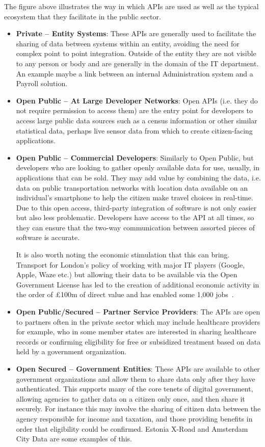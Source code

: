 The figure above illustrates the way in which APIs are used as well as the typical
ecosystem that they facilitate in the public sector.
\begin{itemize}
	\item \textbf{Private – Entity Systems}: These APIs are generally used to facilitate
	 the sharing of data between systems within an entity, avoiding the need
	 for complex point to point integration. Outside of the entity they are not visible
	 to any person or body and are generally in the domain of the IT
	 department. An example maybe a link between an internal Administration system and a Payroll solution.
	 \item \textbf{Open Public – At Large Developer Networks}: Open APIs (i.e. they do
	 not require permission to access them) are the entry point for developers
	 to access large public data sources such as a census information or other
	 similar statistical data, perhaps live sensor data from which to create
	 citizen-facing applications.
	 \item \textbf{Open Public – Commercial Developers}: Similarly to Open Public,
	 but developers who are
	 looking to gather openly available data for use, usually, in applications
	 that can be sold. They may add value by combining the data, i.e.
	 data on public transportation networks with location data available on an
	 individual’s smartphone to help the citizen make travel choices in real-time.
	 Due to this open access, third-party integration of software is not only easier
	 but also less problematic. Developers have access to the API at all times, so they can ensure that the two-way communication between assorted pieces of software is accurate.
	 
	 It is also worth noting the economic stimulation that this can bring. Transport
	 for London’s policy of working with major IT players (Google, Apple, Waze etc.)
	 but allowing their data to be available via the Open Government License has led
	 to the creation of additional economic activity in the order of £100m of direct
	 value and has enabled some 1,000 jobs~\citep{api_industrial_data}.
	 \item \textbf{Open Public/Secured – Partner Service Providers}: The APIs are open to
	 partners often in the private sector which may include healthcare providers
	 for example, who in some member states are interested in sharing healthcare
	 records or confirming eligibility for free or subsidized treatment based on
	 data held by a government organization.
	 \item \textbf{Open Secured – Government Entities}: These APIs are available to other
	 government organizations and allow them to share data only after they have
	 authenticated. This supports many of the core tenets of digital government,
	 allowing agencies to gather data on a citizen only once, and then share it
	 securely. For instance this may involve the sharing of citizen data between
	 the agency responsible for income and taxation, and those providing benefits in
	 order that eligibility could be confirmed. Estonia X-Road and Amsterdam City
	 Data are some examples of this.
	 

\end{itemize}
